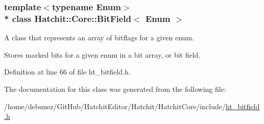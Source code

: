 \subsubsection*{template$<$typename Enum$>$\\*
class Hatchit\+::\+Core\+::\+Bit\+Field$<$ Enum $>$}

A class that represents an array of bitflags for a given enum. 

Stores marked bits for a given enum in a bit array, or bit field. 

Definition at line 66 of file ht\+\_\+bitfield.\+h.



The documentation for this class was generated from the following file\+:\begin{DoxyCompactItemize}
\item 
/home/debunez/\+Git\+Hub/\+Hatchit\+Editor/\+Hatchit/\+Hatchit\+Core/include/\hyperlink{ht__bitfield_8h}{ht\+\_\+bitfield.\+h}\end{DoxyCompactItemize}
